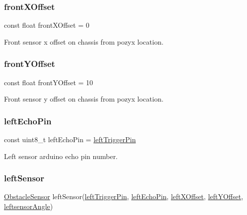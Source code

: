 \mbox{\label{bot_main_8ino_abdd898a2dfa2f64e2821af36c6ed3724}} 
\subsubsection{\texorpdfstring{front\+X\+Offset}{frontXOffset}}
{\footnotesize\ttfamily const float front\+X\+Offset = 0}



Front sensor x offset on chassis from pozyx location. 

\mbox{\label{bot_main_8ino_a4919465d0182f44aa7acaa39ece1e17a}} 
\subsubsection{\texorpdfstring{front\+Y\+Offset}{frontYOffset}}
{\footnotesize\ttfamily const float front\+Y\+Offset = 10}



Front sensor y offset on chassis from pozyx location. 

\mbox{\label{bot_main_8ino_a203479aa2174a6eedd63da361e6e302c}} 
\subsubsection{\texorpdfstring{left\+Echo\+Pin}{leftEchoPin}}
{\footnotesize\ttfamily const uint8\+\_\+t left\+Echo\+Pin = \mbox{\hyperlink{bot_main_8ino_a297d5238270dc0d92e1a65b016a79f2e}{left\+Trigger\+Pin}}}



Left sensor arduino echo pin number. 

\mbox{\label{bot_main_8ino_af137d1119f05ab98ae8e50559b9d6bfe}} 
\subsubsection{\texorpdfstring{left\+Sensor}{leftSensor}}
{\footnotesize\ttfamily \mbox{\hyperlink{class_obstacle_sensor}{Obstacle\+Sensor}} left\+Sensor(\mbox{\hyperlink{bot_main_8ino_a297d5238270dc0d92e1a65b016a79f2e}{left\+Trigger\+Pin}}, \mbox{\hyperlink{bot_main_8ino_a203479aa2174a6eedd63da361e6e302c}{left\+Echo\+Pin}}, \mbox{\hyperlink{bot_main_8ino_a2d121af61e2977de12f5bfbbe8559dca}{left\+X\+Offset}}, \mbox{\hyperlink{bot_main_8ino_a7be9826e4f54e376321bcdea4177a8ed}{left\+Y\+Offset}}, \mbox{\hyperlink{bot_main_8ino_a8be5324bad65fa0bad41e0c70066a958}{leftsensor\+Angle}})}



